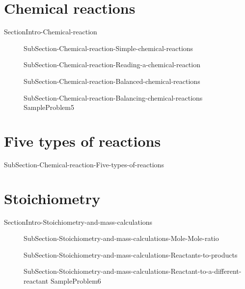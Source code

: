 \documentclass[main.tex]{subfiles}
\begin{document}
\section{Chemical reactions}{SectionIntro-Chemical-reaction}
\sloppy\begin{description}
\item[] {SubSection-Chemical-reaction-Simple-chemical-reactions}
\item[]{SubSection-Chemical-reaction-Reading-a-chemical-reaction}
\item[]{SubSection-Chemical-reaction-Balanced-chemical-reactions}
\item[]{SubSection-Chemical-reaction-Balancing-chemical-reactions}
{SampleProblem5}
\end{description}


\section{Five types of reactions}{SubSection-Chemical-reaction-Five-types-of-reactions}



\section{Stoichiometry}{SectionIntro-Stoichiometry-and-mass-calculations}
\sloppy \begin{description}
\item[]{SubSection-Stoichiometry-and-mass-calculations-Mole-Mole-ratio}
\item[]{SubSection-Stoichiometry-and-mass-calculations-Reactants-to-products}
\item[] {SubSection-Stoichiometry-and-mass-calculations-Reactant-to-a-different-reactant}
{SampleProblem6}
\end{description}
\end{document}
